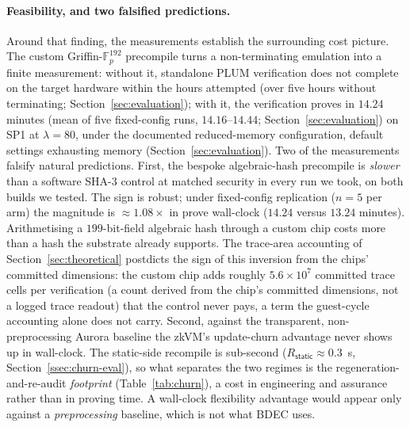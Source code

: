 \paragraph{Feasibility, and two falsified predictions.}
Around that finding, the measurements establish the surrounding cost picture. The custom Griffin-$\mathbb{F}_p^{192}$ precompile turns a non-terminating emulation into a finite measurement: without it, standalone PLUM verification does not complete on the target hardware within the hours attempted (over five hours without terminating; Section~\ref{sec:evaluation}); with it, the verification proves in $14.24$ minutes (mean of five fixed-config runs, $14.16$--$14.44$; Section~\ref{sec:evaluation}) on SP1 at $\lambda=80$, under the documented reduced-memory configuration, default settings exhausting memory (Section~\ref{sec:evaluation}). Two of the measurements falsify natural predictions. First, the bespoke algebraic-hash precompile is \emph{slower} than a software SHA-3 control at matched security in every run we took, on both builds we tested. The sign is robust; under fixed-config replication ($n=5$ per arm) the magnitude is ${\approx}1.08\times$ in prove wall-clock ($14.24$ versus $13.24$ minutes). Arithmetising a $199$-bit-field algebraic hash through a custom chip costs more than a hash the substrate already supports. The trace-area accounting of Section~\ref{sec:theoretical} postdicts the sign of this inversion from the chips' committed dimensions: the custom chip adds roughly $5.6\times10^{7}$ committed trace cells per verification (a count derived from the chip's committed dimensions, not a logged trace readout) that the control never pays, a term the guest-cycle accounting alone does not carry. Second, against the transparent, non-preprocessing Aurora baseline the zkVM's update-churn advantage never shows up in wall-clock. The static-side recompile is sub-second ($R_{\mathsf{static}}\approx 0.3$~s, Section~\ref{ssec:churn-eval}), so what separates the two regimes is the regeneration-and-re-audit \emph{footprint} (Table~\ref{tab:churn}), a cost in engineering and assurance rather than in proving time. A wall-clock flexibility advantage would appear only against a \emph{preprocessing} baseline, which is not what BDEC uses.

